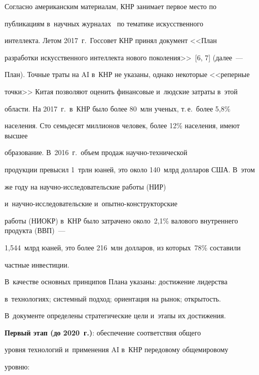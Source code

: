      


     Согласно американским материалам, КНР занимает первое место по 


публикациям в~научных журналах~\cite{5-b} по тематике искусственного 


интеллекта. Летом 2017~г.\ Госсовет КНР принял документ <<План 


разработки искусственного интеллекта нового поколения>>~[6, 7] (далее~--- 


План). Точные траты на AI в~КНР не указаны, однако некоторые <<реперные 


точки>> Китая позволяют оценить финансовые и~людские затраты в~этой 


об\-ласти. На 2017~г.\ в~КНР было более 80~млн ученых, т.\,е.\ более 5,8\% 


населения. Сто семьдесят миллионов человек, более 12\% населения, имеют высшее 


образование. В~2016~г.\ объем продаж на\-уч\-но-тех\-ни\-че\-ской 


продукции превысил 1~трлн юаней, это около 140~млрд долларов США. В~этом 


же году на на\-уч\-но-ис\-сле\-до\-ва\-тель\-ские работы (НИР) 


и~на\-уч\-но-ис\-сле\-до\-ва\-тель\-ские и~опыт\-но-кон\-струк\-тор\-ские 


работы (НИОКР) в~КНР было затрачено около~2,1\% валового внут\-рен\-не\-го продукта (ВВП)~--- 


1,544~млрд юаней, это более 216~млн долларов, из которых~78\% со\-ста\-ви\-ли 


част\-ные инвестиции.


     


     В~качестве основных принципов Плана указаны: достижение лидерства 


в~технологиях; системный подход; ориентация на рынок; открытость. 


В~документе определены стратегические цели и~этапы их достижения.


     


     \textbf{Первый этап ({до 2020~г.})}: обеспечение соответствия общего 


уровня технологий и~применения AI в~КНР передовому общемировому 


уровню:



